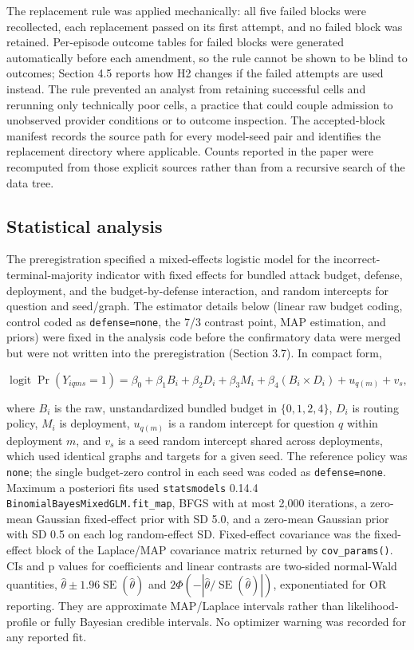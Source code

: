 \documentclass[11pt]{article}
\begin{document}
The replacement rule was applied mechanically: all five failed blocks were recollected, each replacement passed on its first attempt, and no failed block was retained. Per-episode outcome tables for failed blocks were generated automatically before each amendment, so the rule cannot be shown to be blind to outcomes; Section 4.5 reports how H2 changes if the failed attempts are used instead. The rule prevented an analyst from retaining successful cells and rerunning only technically poor cells, a practice that could couple admission to unobserved provider conditions or to outcome inspection. The accepted-block manifest records the source path for every model-seed pair and identifies the replacement directory where applicable. Counts reported in the paper were recomputed from those explicit sources rather than from a recursive search of the data tree.

\subsection{Statistical analysis}

The preregistration specified a mixed-effects logistic model for the incorrect-terminal-majority indicator with fixed effects for bundled attack budget, defense, deployment, and the budget-by-defense interaction, and random intercepts for question and seed/graph. The estimator details below (linear raw budget coding, control coded as \texttt{defense=none}, the 7/3 contrast point, MAP estimation, and priors) were fixed in the analysis code before the confirmatory data were merged but were not written into the preregistration (Section 3.7). In compact form,

\[
\operatorname{logit}\Pr(Y_{iqms}=1)=\beta_0+\beta_1 B_i+\beta_2 D_i+\beta_3 M_i+\beta_4(B_i\times D_i)+u_{q(m)}+v_s,
\]

where \(B_i\) is the raw, unstandardized bundled budget in \(\{0,1,2,4\}\), \(D_i\) is routing policy, \(M_i\) is deployment, \(u_{q(m)}\) is a random intercept for question \(q\) within deployment \(m\), and \(v_s\) is a seed random intercept shared across deployments, which used identical graphs and targets for a given seed. The reference policy was \texttt{none}; the single budget-zero control in each seed was coded as \texttt{defense=none}. Maximum a posteriori fits used \texttt{statsmodels} 0.14.4 \texttt{BinomialBayesMixedGLM.fit\_map}, BFGS with at most 2,000 iterations, a zero-mean Gaussian fixed-effect prior with SD 5.0, and a zero-mean Gaussian prior with SD 0.5 on each log random-effect SD. Fixed-effect covariance was the fixed-effect block of the Laplace/MAP covariance matrix returned by \texttt{cov\_params()}. CIs and p values for coefficients and linear contrasts are two-sided normal-Wald quantities, \(\hat\theta\pm1.96\operatorname{SE}(\hat\theta)\) and \(2\Phi(-|\hat\theta/\operatorname{SE}(\hat\theta)|)\), exponentiated for OR reporting. They are approximate MAP/Laplace intervals rather than likelihood-profile or fully Bayesian credible intervals. No optimizer warning was recorded for any reported fit.
\end{document}
